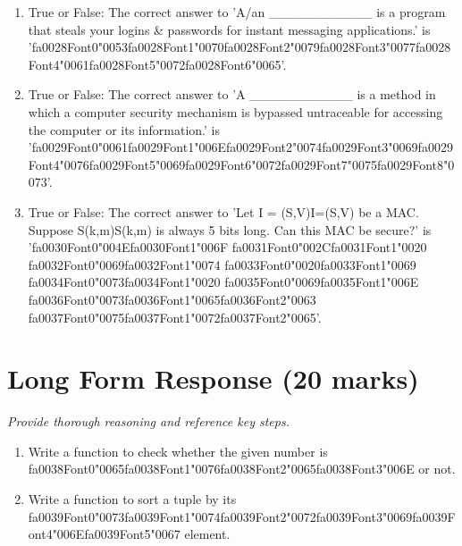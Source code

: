 \documentclass[12pt]{article}
\begin{document}
\begin{enumerate}[label=\arabic*.]
\item True or False: The correct answer to 'A/an \_\_\_\_\_\_\_\_\_\_\_ is a program that steals your logins \& passwords for instant messaging applications.' is '{\csname fa0028Font0\endcsname\char"0053}{\csname fa0028Font1\endcsname\char"0070}{\csname fa0028Font2\endcsname\char"0079}{\csname fa0028Font3\endcsname\char"0077}{\csname fa0028Font4\endcsname\char"0061}{\csname fa0028Font5\endcsname\char"0072}{\csname fa0028Font6\endcsname\char"0065}'.
\item True or False: The correct answer to 'A \_\_\_\_\_\_\_\_\_\_\_ is a method in which a computer security mechanism is bypassed untraceable for accessing the computer or its information.' is '{\csname fa0029Font0\endcsname\char"0061}{\csname fa0029Font1\endcsname\char"006E}{\csname fa0029Font2\endcsname\char"0074}{\csname fa0029Font3\endcsname\char"0069}{\csname fa0029Font4\endcsname\char"0076}{\csname fa0029Font5\endcsname\char"0069}{\csname fa0029Font6\endcsname\char"0072}{\csname fa0029Font7\endcsname\char"0075}{\csname fa0029Font8\endcsname\char"0073}'.
\item True or False: The correct answer to 'Let I = (S,V)I=(S,V) be a MAC. Suppose S(k,m)S(k,m) is always 5 bits long. Can this MAC be secure?' is '{\csname fa0030Font0\endcsname\char"004E}{\csname fa0030Font1\endcsname\char"006F} {\csname fa0031Font0\endcsname\char"002C}{\csname fa0031Font1\endcsname\char"0020} {\csname fa0032Font0\endcsname\char"0069}{\csname fa0032Font1\endcsname\char"0074} {\csname fa0033Font0\endcsname\char"0020}{\csname fa0033Font1\endcsname\char"0069} {\csname fa0034Font0\endcsname\char"0073}{\csname fa0034Font1\endcsname\char"0020} {\csname fa0035Font0\endcsname\char"0069}{\csname fa0035Font1\endcsname\char"006E} {\csname fa0036Font0\endcsname\char"0073}{\csname fa0036Font1\endcsname\char"0065}{\csname fa0036Font2\endcsname\char"0063} {\csname fa0037Font0\endcsname\char"0075}{\csname fa0037Font1\endcsname\char"0072}{\csname fa0037Font2\endcsname\char"0065}'.
\end{enumerate}

\section*{Long Form Response (20 marks)}
\textit{Provide thorough reasoning and reference key steps.}
\begin{enumerate}[label=\arabic*.]
\item Write a function to check whether the given number is {\csname fa0038Font0\endcsname\char"0065}{\csname fa0038Font1\endcsname\char"0076}{\csname fa0038Font2\endcsname\char"0065}{\csname fa0038Font3\endcsname\char"006E} or not.
\item Write a function to sort a tuple by its {\csname fa0039Font0\endcsname\char"0073}{\csname fa0039Font1\endcsname\char"0074}{\csname fa0039Font2\endcsname\char"0072}{\csname fa0039Font3\endcsname\char"0069}{\csname fa0039Font4\endcsname\char"006E}{\csname fa0039Font5\endcsname\char"0067} element.
\end{enumerate}
\end{document}
